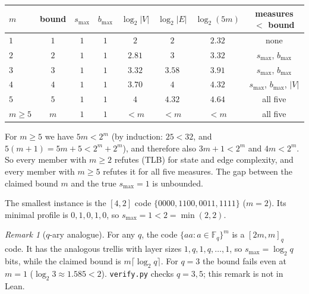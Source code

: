 \documentclass[11pt]{article}
\theoremstyle{definition}
\theoremstyle{remark}
\newtheorem{remark}[theorem]{Remark}
\newcommand{\F}{\mathbb{F}}
\newcommand{\smax}{s_{\max}}
\begin{document}
\begin{center}
\begin{tabular}{@{}lccccccc@{}}
\toprule
$m$ & bound & $\smax$ & $b_{\max}$ & $\log_2|V|$ & $\log_2|E|$ & $\log_2(5m)$ & measures $<$ bound\\
\midrule
$1$ & $1$ & $1$ & $1$ & $2$ & $2$ & $2.32$ & none\\
$2$ & $2$ & $1$ & $1$ & $2.81$ & $3$ & $3.32$ & $\smax$, $b_{\max}$\\
$3$ & $3$ & $1$ & $1$ & $3.32$ & $3.58$ & $3.91$ & $\smax$, $b_{\max}$\\
$4$ & $4$ & $1$ & $1$ & $3.70$ & $4$ & $4.32$ & $\smax$, $b_{\max}$, $|V|$\\
$5$ & $5$ & $1$ & $1$ & $4$ & $4.32$ & $4.64$ & all five\\
$m\ge5$ & $m$ & $1$ & $1$ & $<m$ & $<m$ & $<m$ & all five\\
\bottomrule
\end{tabular}
\end{center}
For $m\ge5$ we have $5m<2^m$ (by induction: $25<32$, and $5(m+1)=5m+5<2^m+2^m$), and
therefore also $3m+1<2^m$ and $4m<2^m$. So every member with $m\ge2$ refutes (TLB) for
state and edge complexity, and every member with $m\ge5$ refutes it for all five
measures. The gap between the claimed bound $m$ and the true $\smax=1$ is
unbounded.

The smallest instance is the $[4,2]$ code $\{0000,1100,0011,1111\}$ ($m=2$). Its
minimal profile is $0,1,0,1,0$, so $\smax=1<2=\min(2,2)$.

\begin{remark}[$q$-ary analogue]
For any $q$, the code $\{aa:a\in\F_q\}^m$ is a $[2m,m]_q$ code. It has the analogous
trellis with layer sizes $1,q,1,q,\dots,1$, so $\smax=\log_2 q$ bits, while the claimed bound is
$m\lceil\log_2 q\rceil$. For $q=3$ the bound fails even at $m=1$
($\log_2 3\approx1.585<2$). \texttt{verify.py} checks $q=3,5$; this remark is not in Lean.
\end{remark}
\end{document}
